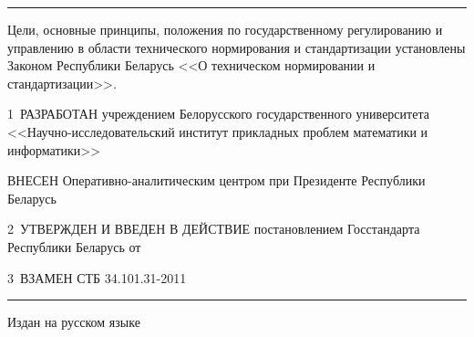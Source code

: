 \hrule 

\rule{0pt}{5mm}
 
\centerline{} 

Цели, основные принципы, положения по государственному регулированию и 
управлению в области технического нормирования и стандартизации 
установлены Законом Республики Беларусь <<О техническом нормировании и 
стандартизации>>.  

1~РАЗРАБОТАН учреждением Белорусского государственного университета 
<<Науч\-но-исследовательский институт прикладных проблем математики и 
информатики>> 

ВНЕСЕН Оперативно-аналитическим центром при Президенте Республики Беларусь 

2~УТВЕРЖДЕН И ВВЕДЕН В ДЕЙСТВИЕ постановлением Госстандарта Республики 
Беларусь от $\phantom{\text{31 января 2011 г.}}$ \No~$\phantom{\text{5}}$

3~ВЗАМЕН СТБ 34.101.31-2011 


\vfill

\hrule
\vskip1mm
Издан на русском языке

\pagebreak
